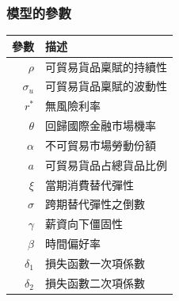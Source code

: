 \documentclass[mathserif]{beamer}
\begin{document}
    \begin{frame}
        \frametitle{模型的參數}
        \centering
        \begin{tabular}[t]{r l}
            參數 & 描述 \\
            \hline
            $\rho$     & 可貿易貨品稟賦的持續性\\
            $\sigma_u$ & 可貿易貨品稟賦的波動性\\
            $r^*$      & 無風險利率\\
            $\theta$   & 回歸國際金融市場機率\\
            $\alpha$   & 不可貿易市場勞動份額\\
            $a$        & 可貿易貨品占總貨品比例\\
            $\xi$      & 當期消費替代彈性\\
            $\sigma$   & 跨期替代彈性之倒數\\
            $\gamma$   & 薪資向下僵固性\\
            $\beta$    & 時間偏好率\\
            $\delta_1$ & 損失函數一次項係數\\
            $\delta_2$ & 損失函數二次項係數\\
            \end{tabular}
    \end{frame}
\end{document}
